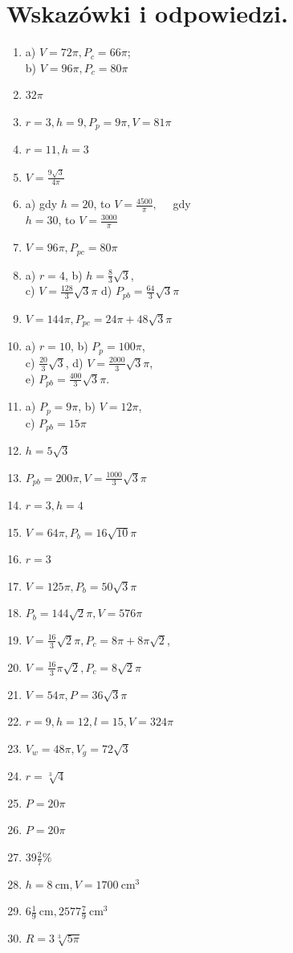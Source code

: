 \documentclass[10pt]{article}
\begin{document}
\section*{Wskazówki i odpowiedzi.}
\begin{enumerate}
  \item a) \(V=72 \pi, P_{c}=66 \pi\);\\
b) \(V=96 \pi, P_{c}=80 \pi\)
  \item \(32 \pi\)
  \item \(r=3, h=9, P_{p}=9 \pi, V=81 \pi\)
  \item \(r=11, h=3\)
  \item \(V=\frac{9 \sqrt{3}}{4 \pi}\)
  \item a) gdy \(h=20\), to \(V=\frac{4500}{\pi}, \quad\) gdy\\
\(h=30\), to \(V=\frac{3000}{\pi}\)
  \item \(V=96 \pi, P_{p c}=80 \pi\)
  \item a) \(r=4\), b) \(h=\frac{8}{3} \sqrt{3}\),\\
c) \(V=\frac{128}{3} \sqrt{3} \pi\) d) \(P_{p b}=\frac{64}{3} \sqrt{3} \pi\)
  \item \(V=144 \pi, P_{p c}=24 \pi+48 \sqrt{3} \pi\)
  \item a) \(r=10\), b) \(P_{p}=100 \pi\),\\
c) \(\frac{20}{3} \sqrt{3}\), d) \(V=\frac{2000}{3} \sqrt{3} \pi\),\\
e) \(P_{p b}=\frac{400}{3} \sqrt{3} \pi\).
  \item a) \(P_{p}=9 \pi\), b) \(V=12 \pi\),\\
c) \(P_{p b}=15 \pi\)
  \item \(h=5 \sqrt{3}\)
  \item \(P_{p b}=200 \pi, V=\frac{1000}{3} \sqrt{3} \pi\)
  \item \(r=3, h=4\)
  \item \(V=64 \pi, P_{b}=16 \sqrt{10} \pi\)
  \item \(r=3\)
  \item \(V=125 \pi, P_{b}=50 \sqrt{3} \pi\)
  \item \(P_{b}=144 \sqrt{2} \pi, V=576 \pi\)
  \item \(V=\frac{16}{3} \sqrt{2} \pi, P_{c}=8 \pi+8 \pi \sqrt{2}\),
  \item \(V=\frac{16}{3} \pi \sqrt{2}, P_{c}=8 \sqrt{2} \pi\)
  \item \(V=54 \pi, P=36 \sqrt{3} \pi\)
  \item \(r=9, h=12, l=15, V=324 \pi\)
  \item \(V_{w}=48 \pi, V_{g}=72 \sqrt{3}\)
  \item \(r=\sqrt[3]{4}\)
  \item \(P=20 \pi\)
  \item \(P=20 \pi\)
  \item \(39 \frac{2}{7} \%\)
  \item \(h=8 \mathrm{~cm}, V=1700 \mathrm{~cm}^{3}\)
  \item \(6 \frac{1}{9} \mathrm{~cm}, 2577 \frac{7}{9} \mathrm{~cm}^{3}\)
  \item \(R=3 \sqrt[3]{5 \pi}\)
\end{enumerate}
\end{document}

